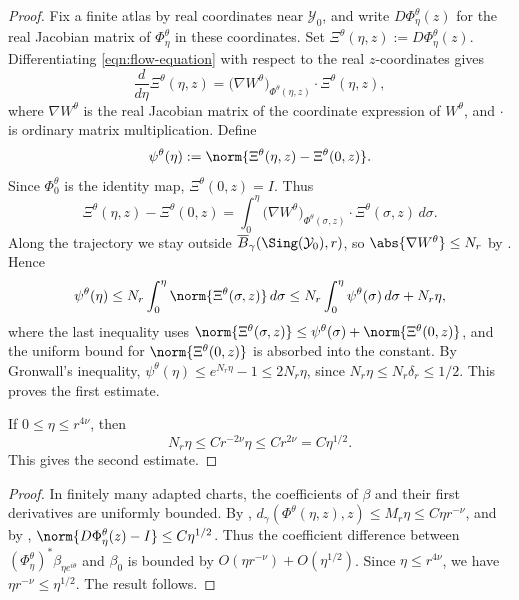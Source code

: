 \documentclass[12pt]{amsart}
\begin{document}
\begin{proof}
Fix a finite atlas by real coordinates near \(\mathcal{Y}_{0}\), and write
\(D\Phi_{\eta}^{\theta}(z)\) for the real Jacobian matrix of \(\Phi_{\eta}^{\theta}\) in these coordinates.
Set \(\Xi^{\theta}(\eta,z):=D\Phi_{\eta}^{\theta}(z)\). Differentiating
\cref{eqn:flow-equation} with respect to the real \(z\)-coordinates gives
\[
\frac{d}{d\eta}\Xi^{\theta}(\eta,z)
=
\bigl(\nabla W^{\theta}\bigr)_{\Phi^{\theta}(\eta,z)}
\cdot\Xi^{\theta}(\eta,z),
\]
where \(\nabla W^{\theta}\) is the real Jacobian matrix of the coordinate expression of \(W^{\theta}\), and
\(\cdot\) is ordinary matrix multiplication. Define
\[
\psi^{\theta}(\eta):=
\norm{\Xi^{\theta}(\eta,z)-\Xi^{\theta}(0,z)}.
\]
Since \(\Phi_{0}^{\theta}\) is the identity map, \(\Xi^{\theta}(0,z)=I\). Thus
\[
\Xi^{\theta}(\eta,z)-\Xi^{\theta}(0,z)
=
\int_{0}^{\eta}
\bigl(\nabla W^{\theta}\bigr)_{\Phi^{\theta}(\sigma,z)}
\cdot\Xi^{\theta}(\sigma,z)\,d\sigma .
\]
Along the trajectory we stay outside \(\overline{B}_{\gamma}(\Sing(\mathcal{Y}_{0}),r)\), so
\(\abs{\nabla W^{\theta}}\leq N_{r}\) by . 
Hence
\[
\psi^{\theta}(\eta)
\leq
N_{r}\int_{0}^{\eta}\norm{\Xi^{\theta}(\sigma,z)}\,d\sigma
\leq
N_{r}\int_{0}^{\eta}\psi^{\theta}(\sigma)\,d\sigma+N_{r}\eta,
\]
where the last inequality uses
\(\norm{\Xi^{\theta}(\sigma,z)}\leq
\psi^{\theta}(\sigma)+\norm{\Xi^{\theta}(0,z)}\), and the uniform bound for
\(\norm{\Xi^{\theta}(0,z)}\) is absorbed into the constant. By Gronwall's inequality,
\(\psi^{\theta}(\eta)\leq e^{N_{r}\eta}-1\leq 2N_{r}\eta\), since
\(N_{r}\eta\leq N_{r}\delta_{r}\leq 1/2\). This proves the first estimate.

If \(0\leq\eta\leq r^{4\nu}\), then
\[
N_{r}\eta\leq Cr^{-2\nu}\eta\leq Cr^{2\nu}=C\eta^{1/2}.
\]
This gives the second estimate.
\end{proof}


\begin{proof}
In finitely many adapted charts, the coefficients of \(\beta\) and their first derivatives are uniformly
bounded. By ,
\(d_{\gamma}(\Phi^{\theta}(\eta,z),z)\leq M_{r}\eta\leq C\eta r^{-\nu}\), and by
, \(\norm{D\Phi_{\eta}^{\theta}(z)-I}\leq C\eta^{1/2}\). Thus the coefficient
difference between \((\Phi_{\eta}^{\theta})^{*}\beta_{\eta e^{i\theta}}\) and \(\beta_{0}\) is bounded by
\(O(\eta r^{-\nu})+O(\eta^{1/2})\). Since \(\eta\leq r^{4\nu}\), we have
\(\eta r^{-\nu}\leq \eta^{1/2}\). The result follows.
\end{proof}
\end{document}
